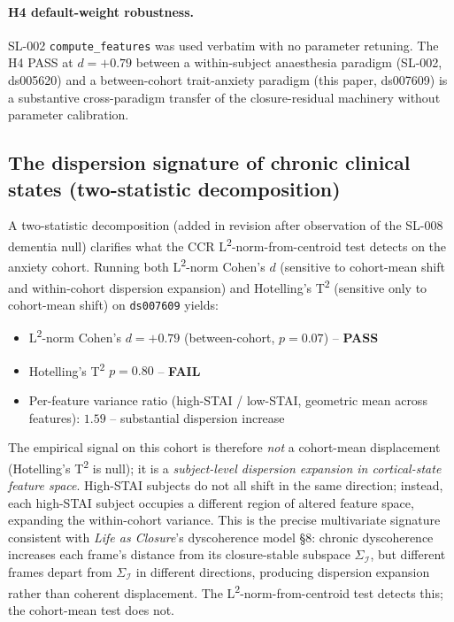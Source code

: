 \documentclass[11pt,a4paper]{article}
\begin{document}
\paragraph{H4 default-weight robustness.} SL-002 \texttt{compute\_features} was used verbatim with no parameter retuning. The H4 PASS at $d = +0.79$ between a within-subject anaesthesia paradigm (SL-002, ds005620) and a between-cohort trait-anxiety paradigm (this paper, ds007609) is a substantive cross-paradigm transfer of the closure-residual machinery without parameter calibration.

\subsection{The dispersion signature of chronic clinical states (two-statistic decomposition)}\label{sec:results-twostat}

A two-statistic decomposition (added in revision after observation of the SL-008 dementia null) clarifies what the CCR L\textsuperscript{2}-norm-from-centroid test detects on the anxiety cohort. Running both L\textsuperscript{2}-norm Cohen's $d$ (sensitive to cohort-mean shift and within-cohort dispersion expansion) and Hotelling's T\textsuperscript{2} (sensitive only to cohort-mean shift) on \texttt{ds007609} yields:

\begin{itemize}\itemsep0pt
\item L\textsuperscript{2}-norm Cohen's $d = +0.79$ (between-cohort, $p = 0.07$) -- \textbf{PASS}
\item Hotelling's T\textsuperscript{2} $p = 0.80$ -- \textbf{FAIL}
\item Per-feature variance ratio (high-STAI / low-STAI, geometric mean across features): $\mathbf{1.59}$ -- substantial dispersion increase
\end{itemize}

The empirical signal on this cohort is therefore \emph{not} a cohort-mean displacement (Hotelling's T\textsuperscript{2} is null); it is a \emph{subject-level dispersion expansion in cortical-state feature space}. High-STAI subjects do not all shift in the same direction; instead, each high-STAI subject occupies a different region of altered feature space, expanding the within-cohort variance. This is the precise multivariate signature consistent with \emph{Life as Closure}'s dyscoherence model \citep{SmartLifeAsClosure} \S 8: chronic dyscoherence increases each frame's distance from its closure-stable subspace $\Sigma_\mathcal{I}$, but different frames depart from $\Sigma_\mathcal{I}$ in different directions, producing dispersion expansion rather than coherent displacement. The L\textsuperscript{2}-norm-from-centroid test detects this; the cohort-mean test does not.
\end{document}
